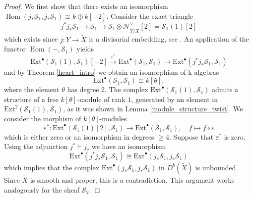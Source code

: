 \documentclass[a4paper, twoside, 11pt]{amsart}
\theoremstyle{definition}
\theoremstyle{remark}
\numberwithin{equation}{theorem}
\DeclareMathOperator{\Hom}{Hom}
\begin{document}
\begin{proof}
    We first show that there exists an isomorphism $\Hom(j_*\mathcal{S}_1, j_*\mathcal{S}_1) \cong k \oplus k[-2]$. Consider the exact triangle
	\begin{equation}\label{triangle_linkage}
		j^*j_*\mathcal{S}_1 \longrightarrow \mathcal{S}_1 \overset{\varepsilon}{\longrightarrow} \mathcal{S}_1\otimes \mathcal{N}_{Y/\widetilde{X}}^\vee[2] = \mathcal{S}_1(1)[2]
	\end{equation}
	which exists since $j \colon Y \to \widetilde{X}$ is a divisorial embedding, see \cite[§3]{exact_triangle}.
    An application of the functor $\Hom(-, \mathcal{S}_1)$ yields 
	\begin{equation}\label{ext_triangle}
		\mathrm{Ext}^{\bullet}(\mathcal{S}_1(1), \mathcal{S}_1)[-2] \overset{\varepsilon^*}{\longrightarrow} \mathrm{Ext}^{\bullet}(\mathcal{S}_1, \mathcal{S}_1) \longrightarrow \mathrm{Ext}^{\bullet}(j^*j_*\mathcal{S}_1, \mathcal{S}_1)
	\end{equation} 
    and by Theorem \ref{heart_intro} we obtain an isomorphism of k-algebras 
    \begin{equation*}
       \mathrm{Ext}^{\bullet}(\mathcal{S}_1, \mathcal{S}_1) \cong k[\theta],
    \end{equation*}
    where the element $\theta$ has degree $2$. 
    The complex $\mathrm{Ext}^{\bullet}(\mathcal{S}_1(1), \mathcal{S}_1)$ admits a structure of a free $k[\theta]$-module of rank $1$, generated by an element in $\mathrm{Ext}^2(\mathcal{S}_1(1), \mathcal{S}_1)$, as it was shown in Lemma \ref{module_structure_twist}. We consider the morphism of $k[\theta]$-modules
	\begin{equation}\label{composition_ext}
		 \varepsilon^* \colon \mathrm{Ext}^{\bullet}(\mathcal{S}_1(1)[2], \mathcal{S}_1) \longrightarrow \mathrm{Ext}^{\bullet}(\mathcal{S}_1, \mathcal{S}_1), \quad f \mapsto f \circ \varepsilon
	\end{equation}
    which is either zero or an isomorphism in degrees $\geq 4$. Suppose that $\varepsilon^*$ is zero. Using the adjunction $j^* \vdash j_*$ we have an isomorphism 
	\begin{equation*}
		\mathrm{Ext}^{\bullet}(j^*j_*\mathcal{S}_1, \mathcal{S}_1) \cong \mathrm{Ext}^{\bullet}(j_*\mathcal{S}_1, j_*\mathcal{S}_1)
	\end{equation*}
	which implies that the complex $\mathrm{Ext}^{\bullet}(j_*\mathcal{S}_1, j_*\mathcal{S}_1)$ in $D^b(\widetilde{X})$ is unbounded. Since $\widetilde{X}$ is smooth and proper, this is a contradiction. This argument works analogously for the sheaf $\mathcal{S}_2$. 
    

\end{proof}
\end{document}
